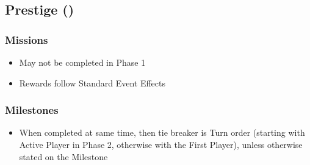 \documentclass[10pt]{article}
\begin{document}
\subsection*{Prestige (\prestige) }

\subsubsection*{Missions}
\begin{itemize}
	\item May not be completed in Phase 1
	\item Rewards follow Standard Event Effects
\end{itemize}

\subsubsection*{Milestones}
\begin{itemize}
	\item When completed at same time, then tie breaker is Turn order (starting with Active Player in Phase 2, otherwise with the First Player), unless otherwise stated on the Milestone
\end{itemize}
\end{document}

